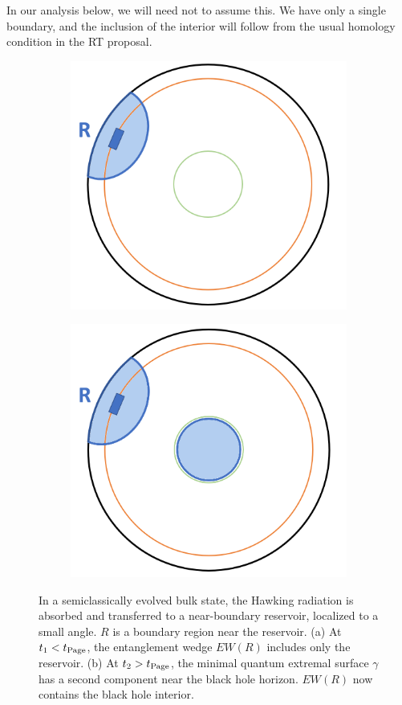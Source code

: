 \documentclass[12pt,letterpaper]{article}
\begin{document}
In our analysis below, we will need not to assume this. We have only a single boundary, and the inclusion of the interior will follow from the usual homology condition in the RT proposal. 
\begin{figure}
\centering
\begin{subfigure}{.5\textwidth}
  \centering
  \includegraphics[width=.8\linewidth]{nema_f}
  \caption{ }
  \label{fig:sub1}
\end{subfigure}%
\begin{subfigure}{.5\textwidth}
  \centering
  \includegraphics[width=.8\linewidth]{ima_f}
  \caption{ }
  \label{fig:sub2}
\end{subfigure}
\caption{In a semiclassically evolved bulk state, the Hawking radiation is absorbed and transferred to a near-boundary reservoir, localized to a small angle. $R$ is a boundary region near the reservoir. (a) At $t_1<t_{\rm Page}$, the entanglement wedge $EW(R)$ includes only the reservoir. (b) At $t_2>t_{\rm Page}$, the minimal quantum extremal surface $\gamma$ has a second component near the black hole horizon. $EW(R)$ now contains the black hole interior.}
\label{fig-localdyson}
\end{figure}
\end{document}
